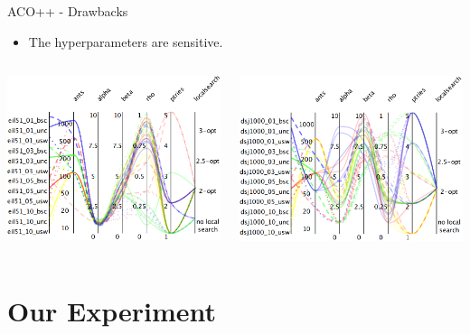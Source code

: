 \documentclass[aspectratio=169]{beamer}
\begin{document}
\begin{frame}{ACO++ - Drawbacks}
\begin{itemize}
    \item The hyperparameters are sensitive.
\end{itemize}
\begin{columns}
    \centering
    \includegraphics[scale=0.45]{img/eil51.png}
    
    \centering
    \includegraphics[scale=0.45]{img/dsj1000.png}        
\end{columns}
\end{frame}

\section{Our Experiment}
\end{document}
